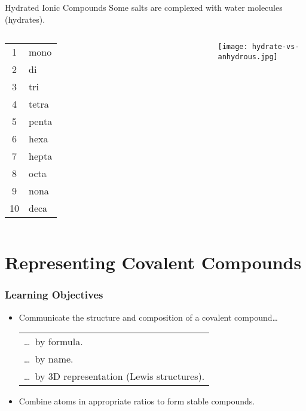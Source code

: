 \documentclass[handout]{beamer}
\begin{document}
%

\begin{frame}{Hydrated Ionic Compounds}
	Some salts are complexed with water molecules (hydrates).

	\begin{columns}
		\begin{tabular} {c@{${} = {}$}l}
			1 & mono \\
			2 & di \\
			3 & tri \\
			4 & tetra \\
			5 & penta \\
			6 & hexa \\
			7 & hepta \\
			8 & octa \\
			9 & nona \\
			10 & deca
		\end{tabular}
		\begin{center}
		\end{center}
		\texttt{[image: hydrate-vs-anhydrous.jpg]}
	\end{columns}
\end{frame}

\section{Representing Covalent Compounds}

\begin{frame}
	\frametitle{Learning Objectives}
	\begin{itemize}
	\item Communicate the structure and composition of a covalent
		compound\ldots

		\begin{tabular} {>{\ldots~}l}
			by formula.           \\
			by name.              \\
			by 3D representation (Lewis structures).
		\end{tabular}
	\item Combine atoms in appropriate ratios to form stable compounds.
	\end{itemize}
\end{frame}
\end{document}

